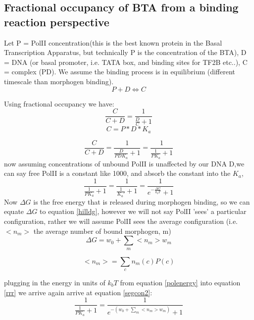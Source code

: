 \subsection{ Fractional occupancy of BTA from a binding reaction perspective }
Let P = PolII concentration(this is the best known protein in the Basal Transcription Apparatus, but technically P is the concentration of the BTA), D = DNA (or basal promoter, i.e. TATA box, and binding sites for TF2B etc..), C = complex (PD).  We assume the binding process is in equilibrium (different timescale than morphogen binding).
\begin{equation}\label{}
    P + D \Leftrightarrow C
\end{equation}

Using fractional occupancy we have:
\begin{equation}\label{}
    \frac{C}{C + D} = \frac{1}{\frac{D}{C} + 1}
\end{equation}
\begin{equation}\label{}
    C = P*D*K_a
\end{equation}

\begin{equation}\label{}
   \frac{C}{C + D} = \frac{1}{\frac{D}{PDK_a} + 1} = \frac{1}{\frac{1}{PK_a} + 1}
\end{equation}
now assuming concentrations of unbound PolII is unaffected by our DNA D,we can say free PolII is a constant like 1000, and absorb the constant into the $K_a$,
\begin{equation}\label{rrr}
    \frac{1}{\frac{1}{PK_a} + 1} = \frac{1}{\frac{1}{K_a'} + 1} =\frac{1}{e^{-\frac{\Delta G}{k_bT} }+ 1}
\end{equation}
Now $\Delta G$ is the free energy that is released during morphogen binding, so  we can equate $ \Delta G $ to equation \eqref{hilldg}, however we will not say PolII 'sees' a particular configuration, rather we will assume PolII sees the average configuration (i.e. $<n_m>$ the average number of bound morphogen, m)
\begin{equation}\label{polenergy}
    \Delta G =  w_{0} + \sum_{m}  <n_m> w_{m}
\end{equation}

\begin{equation}\label{}
     <n_m> =\sum_c n_m(c) P(c)
     \end{equation}

plugging in the energy in units of $k_b T$  from equation \eqref{polenergy} into equation \eqref{rrr} we arrive again arrive at equation \eqref{segcon2}:
\begin{equation}\label{themodel}
      \frac{1}{\frac{1}{PK_a} + 1} = \frac{1}{e^{- (w_{0} + \sum_{m}  <n_m> w_{m} ) }+ 1}
\end{equation}

